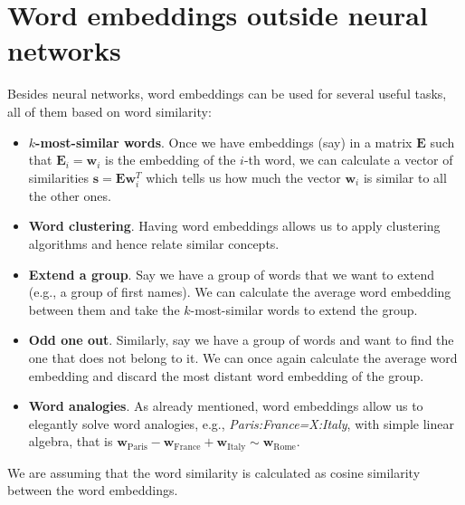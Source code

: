 \section{Word embeddings outside neural networks}
Besides neural networks, word embeddings can be used for several useful tasks, all of them based on word similarity:
\begin{itemize}
    \item \textbf{$k$-most-similar words}. Once we have embeddings (say) in a matrix $\mathbf{E}$ such that $\mathbf{E}_{i}=\mathbf{w}_{i}$ is the embedding of the $i$-th word, we can calculate a vector of similarities $\mathbf{s}=\mathbf{E}\mathbf{w}^{T}_{i}$ which tells us how much the vector \(\mathbf{w}_{i}\) is similar to all the other ones.
    \item \textbf{Word clustering}. Having word embeddings allows us to apply clustering algorithms and hence relate similar concepts.
    \item \textbf{Extend a group}. Say we have a group of words that we want to extend (e.g., a group of first names). We can calculate the average word embedding between them and take the $k$-most-similar words to extend the group.
    \item \textbf{Odd one out}. Similarly, say we have a group of words and want to find the one that does not belong to it. We can once again calculate the average word embedding and discard the most distant word embedding of the group.
    \item \textbf{Word analogies}. As already mentioned, word embeddings allow us to elegantly solve word analogies, e.g., \textit{Paris:France=X:Italy}, with simple linear algebra, that is $\mathbf{w}_{\text{Paris}}-\mathbf{w}_{\text{France}}+\mathbf{w}_{\text{Italy}}\sim \mathbf{w}_{\text{Rome}}$.
\end{itemize}

\begin{note}{}
    We are assuming that the word similarity is calculated as cosine similarity between the word embeddings.
\end{note}